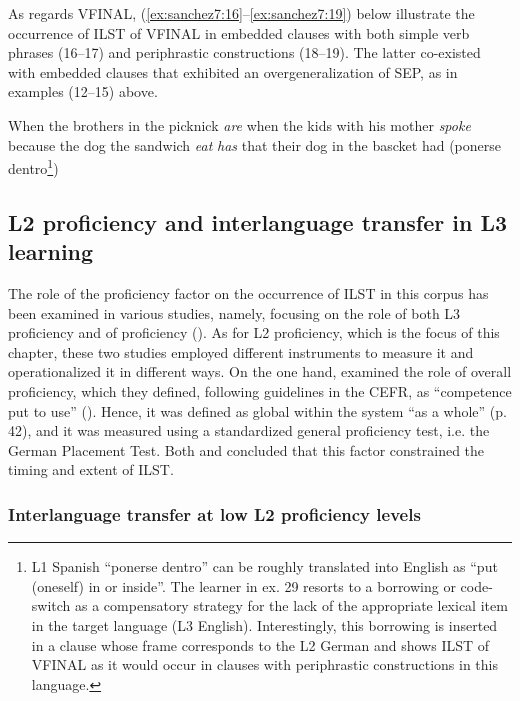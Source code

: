 \documentclass[output=paper,modfonts,nonflat, newtxmath]{langsci/langscibook}
\begin{document}
As regards VFINAL, (\ref{ex:sanchez7:16}--\ref{ex:sanchez7:19}) below illustrate the occurrence of ILST of VFINAL in embedded clauses with both simple verb phrases (16--17) and periphrastic constructions (18--19). The latter co-existed with embedded clauses that exhibited an overgeneralization of SEP, as in examples (12--15) above.

\ea%
  \label{ex:sanchez7:16}
  When the brothers in the picknick {\textit{are}}
\ex %
  \label{ex:sanchez7:17}
  when the kids with his mother {\textit{spoke}}
\ex %
  \label{ex:sanchez7:18}
  	because the dog the sandwich {\textit{eat}} {\textit{has}}
\ex %
  \label{ex:sanchez7:19}
  that their dog in the bascket {{had}} ({{ponerse} {dentro}}\footnote{L1 Spanish “ponerse dentro” can be roughly translated into English as “put (oneself) in or inside”. The learner in ex. 29 resorts to a borrowing or code-switch as a compensatory strategy for the lack of the appropriate lexical item in the target language (L3 English). Interestingly, this borrowing is inserted in a clause whose frame corresponds to the L2 German and shows ILST of VFINAL as it would occur in clauses with periphrastic constructions in this language.})
\z


\subsection{{L2} {proficiency} {and} {interlanguage} {transfer} {in} {L3} {learning}}%


The role of the proficiency factor on the occurrence of ILST in this corpus has been examined in various studies, namely, focusing on the role of both L3 proficiency \citep{Sánchez2014} and of proficiency (\citealt{Sánchez2011, SánchezBardel2017}). As for L2 proficiency, which is the focus of this chapter, these two studies employed different instruments to measure it and operationalized it in different ways. On the one hand, \citet{SánchezBardel2017} examined the role of {overall} proficiency, which they defined, following guidelines in the CEFR, as “competence put to use” (\citealt[187]{CouncilofEurope2001}). Hence, it was defined as global within the system “as a whole” (p. 42), and it was measured using a standardized general proficiency test, i.e. the German Placement Test. Both \citet{Sánchez2011} and \citet{SánchezBardel2017} concluded that this factor constrained the timing and extent of ILST.

\subsubsection{Interlanguage transfer at low L2 proficiency levels}%
\end{document}
